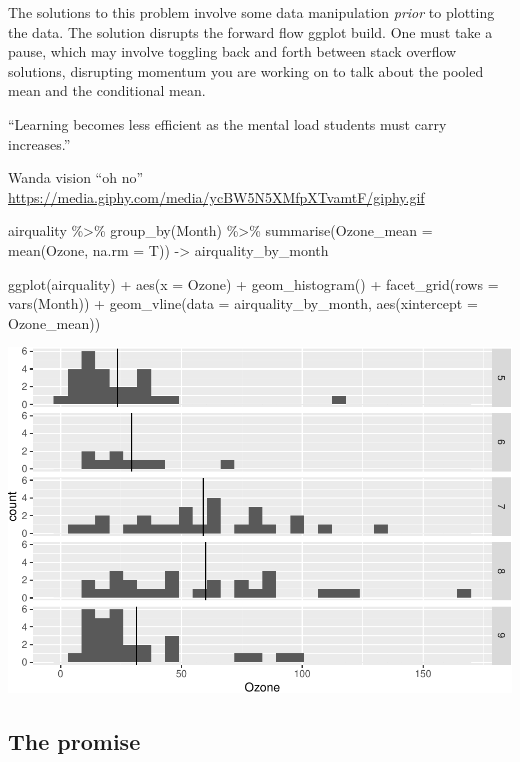 \documentclass[12pt]{article}
\newenvironment{Shaded}{\begin{snugshade}}{\end{snugshade}}
\newcommand{\AttributeTok}[1]{\textcolor[rgb]{0.77,0.63,0.00}{#1}}
\newcommand{\FunctionTok}[1]{\textcolor[rgb]{0.00,0.00,0.00}{#1}}
\newcommand{\NormalTok}[1]{#1}
\newcommand{\OtherTok}[1]{\textcolor[rgb]{0.56,0.35,0.01}{#1}}
\newcommand{\SpecialCharTok}[1]{\textcolor[rgb]{0.00,0.00,0.00}{#1}}
\begin{document}
The solutions to this problem involve some data manipulation
\emph{prior} to plotting the data. The solution disrupts the forward
flow ggplot build. One must take a pause, which may involve toggling
back and forth between stack overflow solutions, disrupting momentum you
are working on to talk about the pooled mean and the conditional mean.

``Learning becomes less efficient as the mental load students must carry
increases.'' \citep{lovett2000statscongnitive}

Wanda vision ``oh no''
\url{https://media.giphy.com/media/ycBW5N5XMfpXTvamtF/giphy.gif}

\begin{Shaded}
\begin{Highlighting}[]
\NormalTok{airquality }\SpecialCharTok{\%\textgreater{}\%} 
  \FunctionTok{group\_by}\NormalTok{(Month) }\SpecialCharTok{\%\textgreater{}\%} 
  \FunctionTok{summarise}\NormalTok{(}\AttributeTok{Ozone\_mean =} \FunctionTok{mean}\NormalTok{(Ozone, }\AttributeTok{na.rm =}\NormalTok{ T)) }\OtherTok{{-}\textgreater{}}
\NormalTok{airquality\_by\_month}

\FunctionTok{ggplot}\NormalTok{(airquality) }\SpecialCharTok{+} 
  \FunctionTok{aes}\NormalTok{(}\AttributeTok{x =}\NormalTok{ Ozone) }\SpecialCharTok{+} 
  \FunctionTok{geom\_histogram}\NormalTok{() }\SpecialCharTok{+} 
  \FunctionTok{facet\_grid}\NormalTok{(}\AttributeTok{rows =} \FunctionTok{vars}\NormalTok{(Month)) }\SpecialCharTok{+}
  \FunctionTok{geom\_vline}\NormalTok{(}\AttributeTok{data =}\NormalTok{ airquality\_by\_month, }
             \FunctionTok{aes}\NormalTok{(}\AttributeTok{xintercept =} 
\NormalTok{               Ozone\_mean))}
\end{Highlighting}
\end{Shaded}

\begin{center}\includegraphics[width=0.5\linewidth]{skeleton_files/figure-latex/unnamed-chunk-4-1} \end{center}

\hypertarget{the-promise}{%
\subsection{The promise}\label{the-promise}}
\end{document}
